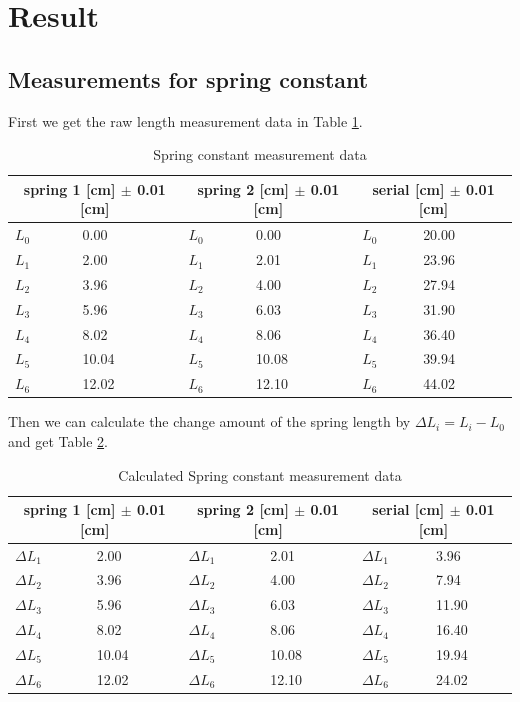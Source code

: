 \section{Result}

\subsection{Measurements for spring constant}

First we get the raw length measurement data in Table \ref{s1}.
\begin{table}[H]
\centering
\begin{tabular}{|p{0.7cm}|p{3cm}||p{0.7cm}|p{3cm}||p{0.7cm}|p{3cm}|}
\hline
\multicolumn{2}{|c|}{spring 1 [cm] $\pm$ 0.01 [cm]} &
\multicolumn{2}{|c|}{spring 2 [cm] $\pm$ 0.01 [cm]} &
\multicolumn{2}{|c|}{serial   [cm] $\pm$ 0.01 [cm]} \\ \hline
$L_0$ & 0.00  & $L_0$ & 0.00  & $L_0$ & 20.00 \\ \hline
$L_1$ & 2.00  & $L_1$ & 2.01  & $L_1$ & 23.96 \\ \hline
$L_2$ & 3.96  & $L_2$ & 4.00  & $L_2$ & 27.94 \\ \hline
$L_3$ & 5.96  & $L_3$ & 6.03  & $L_3$ & 31.90 \\ \hline
$L_4$ & 8.02  & $L_4$ & 8.06  & $L_4$ & 36.40 \\ \hline
$L_5$ & 10.04 & $L_5$ & 10.08 & $L_5$ & 39.94 \\ \hline
$L_6$ & 12.02 & $L_6$ & 12.10 & $L_6$ & 44.02 \\ \hline
\end{tabular}
\caption{Spring constant measurement data}
\label{s1}
\end{table}

Then we can calculate the change amount of the spring length by $\Delta L_i=L_i-L_0$ and get Table \ref{s2}.

\begin{table}[H]
\centering
\begin{tabular}{|p{0.7cm}|p{3cm}||p{0.7cm}|p{3cm}||p{0.7cm}|p{3cm}|}
\hline
\multicolumn{2}{|c|}{spring 1 [cm] $\pm$ 0.01 [cm]} &
\multicolumn{2}{|c|}{spring 2 [cm] $\pm$ 0.01 [cm]} &
\multicolumn{2}{|c|}{serial   [cm] $\pm$ 0.01 [cm]} \\ \hline
$\Delta L_1$ & 2.00  & $\Delta L_1$ & 2.01  & $\Delta L_1$ & 3.96  \\ \hline
$\Delta L_2$ & 3.96  & $\Delta L_2$ & 4.00  & $\Delta L_2$ & 7.94  \\ \hline
$\Delta L_3$ & 5.96  & $\Delta L_3$ & 6.03  & $\Delta L_3$ & 11.90 \\ \hline
$\Delta L_4$ & 8.02  & $\Delta L_4$ & 8.06  & $\Delta L_4$ & 16.40 \\ \hline
$\Delta L_5$ & 10.04 & $\Delta L_5$ & 10.08 & $\Delta L_5$ & 19.94 \\ \hline
$\Delta L_6$ & 12.02 & $\Delta L_6$ & 12.10 & $\Delta L_6$ & 24.02 \\ \hline
\end{tabular}
\caption{Calculated Spring constant measurement data}
\label{s2}
\end{table}

